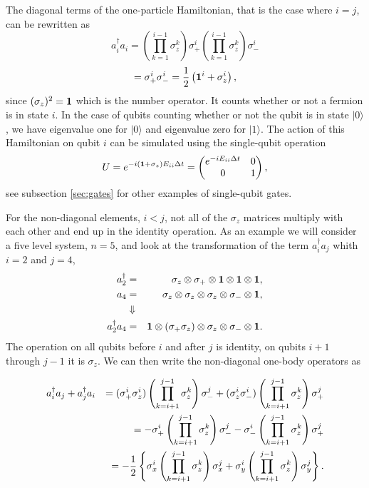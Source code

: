 \documentclass[aps,pra,twocolumn,floatfix]{revtex4}
\begin{document}
The diagonal terms of the one-particle Hamiltonian, 
that is the case where $i=j$, can be rewritten as
\[
a^\dag_i a_i = \left(\prod_{k=1}^{i-1} \sigma_z^k\right) \sigma_+^i
\left(\prod_{k=1}^{i-1} \sigma_z^k \right)\sigma_-^i
\]
\begin{equation}
\label{eq:H_1Sigmas}
= \sigma_+^i \sigma_-^i = \frac{1}{2}\left({\bf 1}^i + \sigma_z^i\right),
\end{equation}
since $(\sigma_z)^2= {\bf 1}$ which is the number operator. It counts whether or not a fermion is in
state $i$. In the case of qubits counting whether or not the qubit
is in state $ |0\rangle $, we have eigenvalue one for $ |0\rangle $ and eigenvalue
zero for $ |1\rangle $. The action of this Hamiltonian on qubit $i$ can be simulated using
the single-qubit operation 
\begin{equation}
U=e^{-i({\bf 1} + \sigma_z) E_{ii}\Delta t} = \begin{pmatrix}
  e^{-iE_{ii}\Delta t} & 0 \\
  0 & 1 
\end{pmatrix},
\end{equation}
see subsection \ref{sec:gates} for other examples of single-qubit gates.

For the non-diagonal elements, $i<j$,  not all of the $\sigma_z$ matrices multiply with each
other and end up in the identity operation. 
As an example we will consider a five level system, $n=5$, and look
at the transformation of the term $a^\dag_ia_j$ whith $i=2$ and $j=4$,
\begin{eqnarray}
\label{eq:fiveQubitSystem}
a_2^\dag& = &\sigma_z\otimes\sigma_+\otimes {\bf 1} \otimes {\bf 1}\otimes {\bf 1}, \notag\\
a_4 & = & \sigma_z\otimes\sigma_z\otimes\sigma_z\otimes\sigma_-\otimes {\bf 1}, \notag\\ 
 & \Downarrow & \notag\\
a_2^\dag a_4 & = & {\bf 1}\otimes (\sigma_+\sigma_z)\otimes \sigma_z \otimes \sigma_-\otimes {\bf 1}.
\end{eqnarray}
The operation on all qubits
before $i$ and after $j$ is identity, on qubits $i+1$ through
$j-1$ it is  $\sigma_z$.  
We can then write the non-diagonal one-body operators as
\begin{widetext}
\begin{eqnarray}
\label{eq:singleParticle}
a^\dag_i a_j + a^\dag_j a_i &&= (\sigma_+^i\sigma_z^i)
\left(\prod_{k=i+1}^{j-1} 
\sigma_z^k \right)\sigma_-^j
+
(\sigma_z^i\sigma_-^i) \left(\prod_{k=i+1}^{j-1}
\sigma_z^k \right)\sigma_+^j \notag\\
&&= - \sigma_+^i \left(\prod_{k=i+1}^{j-1}\sigma_z^k \right)\sigma_-^j
- \sigma_-^i \left(\prod_{k=i+1}^{j-1}
\sigma_z^k \right)\sigma_+^j \notag\\
&&= -\frac{1}{2} \left\{ 
\sigma_x^i \left(\prod_{k=i+1}^{j-1}\sigma_z^k \right)\sigma_x^j
+ \sigma_y^i \left(\prod_{k=i+1}^{j-1}\sigma_z^k \right)\sigma_y^j
\right\}.
\end{eqnarray}
\end{widetext}
\end{document}
